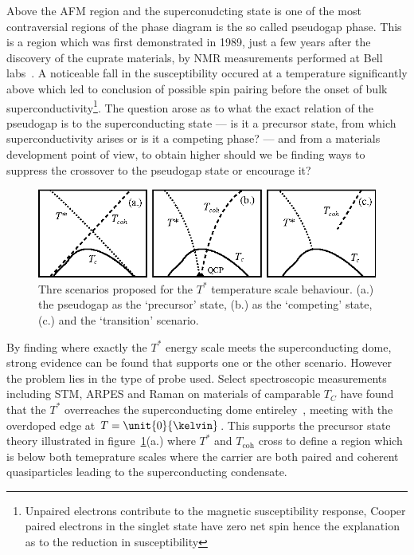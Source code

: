 Above the \ac{AFM} region and the superconudcting state is one of the most contraversial regions of the phase diagram is the so called pseudogap phase. This is a region which was first demonstrated in 1989, just a few years after the discovery of the cuprate materials, by \ac{NMR} measurements performed at Bell labs~\cite{Warren1989}. A noticeable fall in the susceptibility occured at a temperature significantly above \Tc which led to conclusion of possible spin pairing before the onset of bulk superconductivity\footnote{Unpaired electrons contribute to the magnetic susceptibility response, Cooper paired electrons in the singlet state have zero net spin hence the explanation as to the reduction in susceptibility}. The question arose as to what the exact relation of the pseudogap is to the superconducting state --- is it a precursor state, from which superconductivity arises or is it a competing phase? --- and from a materials development point of view, to obtain higher \Tc should we be finding ways to suppress the crossover to the pseudogap state or encourage it?
\begin{figure}[htbp]
    \begin{center}
        \includegraphics[scale=0.9]{Chapter-Introduction/Figures/PGScenarios/PGScenarios}
        \caption{Thre scenarios proposed for the $T^*$ temperature scale behaviour. (a.) the pseudogap as the `precursor' state, (b.) as the `competing' state, (c.) and the `transition' scenario.}
        \label{Fig:Intro:PGScenario}
    \end{center}
\end{figure}
By finding where exactly the $T^*$ energy scale meets the superconducting dome, strong evidence can be found that supports one or the other scenario. However the problem lies in the type of probe used. Select spectroscopic measurements including \ac{STM}, \ac{ARPES} and Raman on materials of camparable $T_C$ have found that the $T^*$ overreaches the superconducting dome entireley~\cite{Hufner2008}, meeting with the overdoped edge at $T=\unit{0}{\kelvin}$. This supports the precursor state theory illustrated in figure~\ref{Fig:Intro:PGScenario}(a.) where $T^*$ and $T_{\textrm{coh}}$ cross to define a region which is below both temeprature scales where the carrier are both paired and coherent quasiparticles leading to the superconducting condensate.

